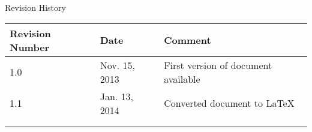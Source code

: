 \begin{center}
  {\large Revision History}
  \begin{tabular}{ | l | l | l | }
    \hline
    Revision Number & Date           & Comment \\
    \hline \hline
    1.0             & Nov. 15, 2013  & First version of document available \\ \hline
    1.1             & Jan. 13, 2014  & Converted document to \LaTeX \\ \hline
                    &                & \\ \hline
                    &                & \\ \hline
  \end{tabular}
\end{center}

\newpage
